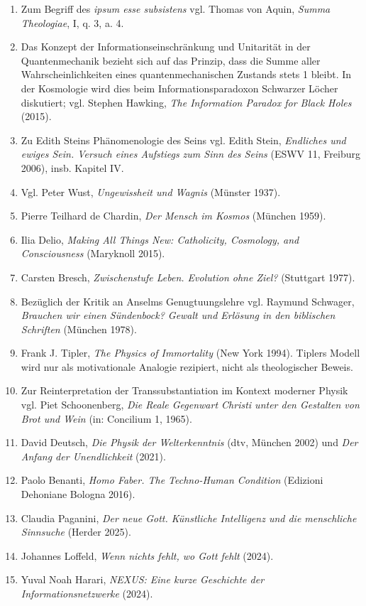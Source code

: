 \documentclass[
  ngerman,
]{article}
\begin{document}
\begin{enumerate}
\def\labelenumi{\arabic{enumi}.}
\item
  Zum Begriff des \emph{ipsum esse subsistens} vgl. Thomas von Aquin,
  \emph{Summa Theologiae}, I, q. 3, a. 4.
\item
  Das Konzept der Informationseinschränkung und Unitarität in der
  Quantenmechanik bezieht sich auf das Prinzip, dass die Summe aller
  Wahrscheinlichkeiten eines quantenmechanischen Zustands stets 1
  bleibt. In der Kosmologie wird dies beim Informationsparadoxon
  Schwarzer Löcher diskutiert; vgl. Stephen Hawking, \emph{The
  Information Paradox for Black Holes} (2015).
\item
  Zu Edith Steins Phänomenologie des Seins vgl. Edith Stein,
  \emph{Endliches und ewiges Sein. Versuch eines Aufstiegs zum Sinn des
  Seins} (ESWV 11, Freiburg 2006), insb. Kapitel IV.
\item
  Vgl. Peter Wust, \emph{Ungewissheit und Wagnis} (Münster 1937).
\item
  Pierre Teilhard de Chardin, \emph{Der Mensch im Kosmos} (München
  1959).
\item
  Ilia Delio, \emph{Making All Things New: Catholicity, Cosmology, and
  Consciousness} (Maryknoll 2015).
\item
  Carsten Bresch, \emph{Zwischenstufe Leben. Evolution ohne Ziel?}
  (Stuttgart 1977).
\item
  Bezüglich der Kritik an Anselms Genugtuungslehre vgl. Raymund
  Schwager, \emph{Brauchen wir einen Sündenbock? Gewalt und Erlösung in
  den biblischen Schriften} (München 1978).
\item
  Frank J. Tipler, \emph{The Physics of Immortality} (New York 1994).
  Tiplers Modell wird nur als motivationale Analogie rezipiert, nicht
  als theologischer Beweis.
\item
  Zur Reinterpretation der Transsubstantiation im Kontext moderner
  Physik vgl. Piet Schoonenberg, \emph{Die Reale Gegenwart Christi unter
  den Gestalten von Brot und Wein} (in: Concilium 1, 1965).
\item
  David Deutsch, \emph{Die Physik der Welterkenntnis} (dtv, München
  2002) und \emph{Der Anfang der Unendlichkeit} (2021).
\item
  Paolo Benanti, \emph{Homo Faber. The Techno-Human Condition} (Edizioni
  Dehoniane Bologna 2016).
\item
  Claudia Paganini, \emph{Der neue Gott. Künstliche Intelligenz und die
  menschliche Sinnsuche} (Herder 2025).
\item
  Johannes Loffeld, \emph{Wenn nichts fehlt, wo Gott fehlt} (2024).
\item
  Yuval Noah Harari, \emph{NEXUS: Eine kurze Geschichte der
  Informationsnetzwerke} (2024).
\end{enumerate}
\end{document}
